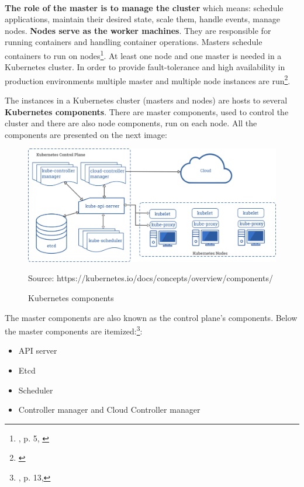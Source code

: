 \documentclass[12pt]{article}
\begin{document}
\paragraph{}
\textbf{The role of the master is to manage the cluster} which means: schedule applications, maintain their desired state, scale them, handle events, manage nodes. \textbf{Nodes serve as the worker machines}. They are responsible for running containers and handling container operations. Masters schedule containers to run on nodes\footnote{\cite{book-mastering-k8s}, p. 5, \cite{k8s-cluster}}. At least one node and one master is needed in a Kubernetes cluster. In order to provide fault-tolerance and high availability in production environments multiple master and multiple node instances are run\footnote{\cite{k8s-components}}.

The instances in a Kubernetes cluster (masters and nodes) are hosts to several \textbf{Kubernetes components}. There are master components, used to control the cluster and there are also node components, run on each node. All the components are presented on the next image:
\begin{figure}[H]
    \centering
    \includegraphics[width=14cm]{figures/components-of-kubernetes.png}
    \label{fig:cluster}
    \caption{Kubernetes components}
    \small{Source: https://kubernetes.io/docs/concepts/overview/components/}
\end{figure}


The master components are also known as the control plane’s components. Below the master components are itemized:\footnote{\cite{book-mastering-k8s}, p. 13,\cite{k8s-components}}:
\begin{itemize}
\item API server
\item Etcd
\item Scheduler
\item Controller manager and Cloud Controller manager
\end{itemize}
\end{document}
